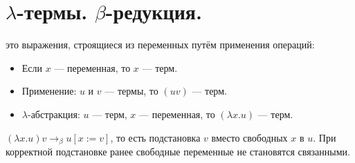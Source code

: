 \section{\texorpdfstring{$\lambda$}{}-термы. \texorpdfstring{$\beta$}{}-редукция.}


\begin{definition}
это выражения, строящиеся из переменных путём применения операций:
\begin{itemize}
    \item Если $x$ --- переменная, то $x$ --- терм.
    \item Применение: $u$ и $v$ --- термы, то $(uv)$ --- терм.
    \item $\lambda$-абстракция: $u$ --- терм, $x$ --- переменная, то $(\lambda x.u)$ --- терм.
\end{itemize}
\end{definition}

\begin{definition}
$(\lambda x.u)v \rightarrow_\beta u[x := v]$, то есть подстановка $v$ вместо свободных $x$ в $u$.
При корректной подстановке ранее свободные переменные не становятся связанными.
\end{definition}
